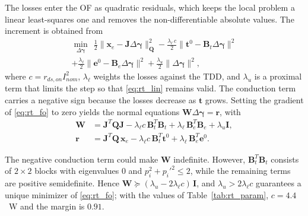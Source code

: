 \documentclass[conference]{IEEEtran}
\newcommand{\gv}{\boldsymbol{\gamma}}
\begin{document}
The losses enter the OF as quadratic residuals, which keeps the local
problem a linear least-squares one and removes the non-differentiable
absolute values. The increment is obtained from
%
\begin{multline}
  \min_{\Delta\gv}\ \
  \frac{1}{2}\big\|\mathbf{x}_e - \mathbf{J}\Delta\gv\big\|_{\mathbf{Q}}^2
  - \frac{\lambda_{\ell}\,c}{2}\big\|\mathbf{t}^0 - \mathbf{B}_t\Delta\gv\big\|^2
  \\
  + \frac{\lambda_{\ell}}{2}\big\|\mathbf{e}^0 - \mathbf{B}_e\Delta\gv\big\|^2
  + \frac{\lambda_u}{2}\big\|\Delta\gv\big\|^2,
  \label{eq:rt_fo}
\end{multline}
%
where $c = r_{ds,on}I_{nom}^2$, $\lambda_{\ell}$ weights the losses
against the TDD, and $\lambda_u$ is a proximal term that limits the step so
that \eqref{eq:rt_lin} remains valid. The conduction term carries a
negative sign because the losses decrease as $\mathbf{t}$ grows. Setting
the gradient of \eqref{eq:rt_fo} to zero yields the normal equations
$\mathbf{W}\Delta\gv = \mathbf{r}$, with
%
\begin{align}
  \mathbf{W} &= \mathbf{J}^T\mathbf{Q}\mathbf{J}
    - \lambda_{\ell}c\,\mathbf{B}_t^T\mathbf{B}_t
    + \lambda_{\ell}\,\mathbf{B}_e^T\mathbf{B}_e + \lambda_u\mathbf{I},
  \nonumber\\
  \mathbf{r} &= \mathbf{J}^T\mathbf{Q}\,\mathbf{x}_e
    - \lambda_{\ell}c\,\mathbf{B}_t^T\mathbf{t}^0
    + \lambda_{\ell}\,\mathbf{B}_e^T\mathbf{e}^0.
  \label{eq:rt_W}
\end{align}

The negative conduction term could make $\mathbf{W}$ indefinite. However,
$\mathbf{B}_t^T\mathbf{B}_t$ consists of $2\times2$ blocks with eigenvalues
$0$ and $p_i^2+p_i'^2\leq 2$, while the remaining terms are positive
semidefinite. Hence $\mathbf{W}\succeq(\lambda_u-2\lambda_{\ell}c)\,\mathbf{I}$,
and $\lambda_u > 2\lambda_{\ell}c$ guarantees a unique minimizer of
\eqref{eq:rt_fo}; with the values of Table~\ref{tab:rt_param},
$c = 4.4$~W and the margin is $0.91$.
\end{document}
